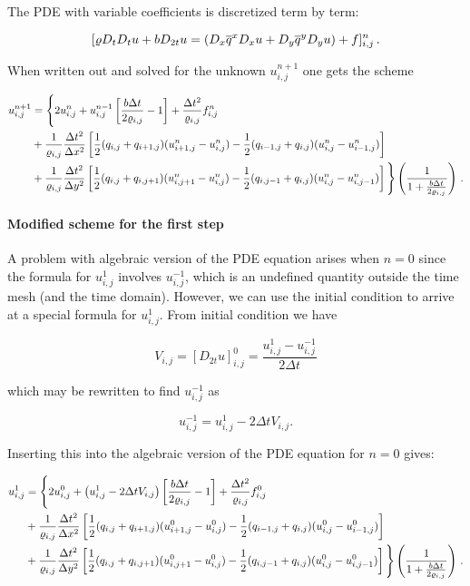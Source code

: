 \documentclass[letterpaper,10pt,english]{/usr/share/sphinx/texinputs/sphinxhowto}
\begin{document}
The PDE with variable coefficients is discretized term by term:

\[
[\varrho D_tD_t u + b D_{2t} u  = (D_x\overline{q}^x D_x u +
D_y\overline{q}^y D_yu ) + f]^n_{i,j}
\thinspace .
\]

When written out and solved for the unknown $u^{n+1}_{i,j}$ one gets the
scheme

\begin{align*}u^{n+1}_{i,j} &= 
\Bigg\{
2u^{n}_{i,j} + u^{n-1}_{i,j}\left[\frac{b \Delta t}{2\varrho_{i,j}} - 1\right]+\frac{\Delta t^2}{\varrho_{i,j}} f^n_{i,j} \\
&+ \frac{1}{\varrho_{i,j}}\frac{\Delta t^2}{\Delta x^2} 
\left[ \frac{1}{2}(q_{i,j} + q_{i+1,j})(u^{n}_{i+1,j} - u^{n}_{i,j}) - \frac{1}{2}(q_{i-1,j} + q_{i,j})(u^{n}_{i,j} - u^{n}_{i-1,j})\right] \\
&+ \frac{1}{\varrho_{i,j}}\frac{\Delta t^2}{\Delta y^2} 
\left[ \frac{1}{2}(q_{i,j} + q_{i,j+1})(u^{n}_{i,j+1} - u^{n}_{i,j}) -\frac{1}{2}(q_{i,j-1} + q_{i,j})(u^{n}_{i,j} - u^{n}_{i,j-1})\right]
\Bigg\} \left(\frac{1}{1+ \frac{b\Delta t}{2\varrho_{i,j} }}\right )
\thinspace .\end{align*}\paragraph{Modified scheme for the first step}

A problem with algebraic version of the PDE equation arises when $n=0$
since the formula for $u^1_{i,j}$ involves $u^{-1}_{i,j}$, which is an
undefined quantity outside the time mesh (and the time domain). However,
we can use the initial condition to arrive at a special formula for
$u^1_{i,j}$. From initial condition we have

\[ V_{i,j} = [D_{2t} u]_{i,j}^0 = \frac{u_{i,j}^{1} - u_{i,j}^{-1}}{2\Delta t} \]

which may be rewritten to find $u_{i,j}^{-1}$ as

\[
 u^{-1}_{i,j} =u^1_{i,j} -  2\Delta t V_{i,j}.
\]

Inserting this into the algebraic version of the PDE equation for $n=0$
gives:

\begin{align*}u^{1}_{i,j} &= 
\Bigg\{
2u^{0}_{i,j} + \left( u^1_{i,j} -  2\Delta t V_{i,j} \right)\left[\frac{b \Delta t}{2\varrho_{i,j}} - 1\right]+\frac{\Delta t^2}{\varrho_{i,j}} f^0_{i,j} \\
&+ \frac{1}{\varrho_{i,j}}\frac{\Delta t^2}{\Delta x^2} 
\left[ \frac{1}{2}(q_{i,j} + q_{i+1,j})(u^{0}_{i+1,j} - u^{0}_{i,j}) - \frac{1}{2}(q_{i-1,j} + q_{i,j})(u^{0}_{i,j} - u^{0}_{i-1,j})\right] \\
&+ \frac{1}{\varrho_{i,j}}\frac{\Delta t^2}{\Delta y^2} 
\left[ \frac{1}{2}(q_{i,j} + q_{i,j+1})(u^{0}_{i,j+1} - u^{0}_{i,j}) -\frac{1}{2}(q_{i,j-1} + q_{i,j})(u^{0}_{i,j} - u^{0}_{i,j-1})\right]
\Bigg\} \left(\frac{1}{1+ \frac{b\Delta t}{2\varrho_{i,j} }}\right )
\thinspace .\end{align*}
\end{document}
